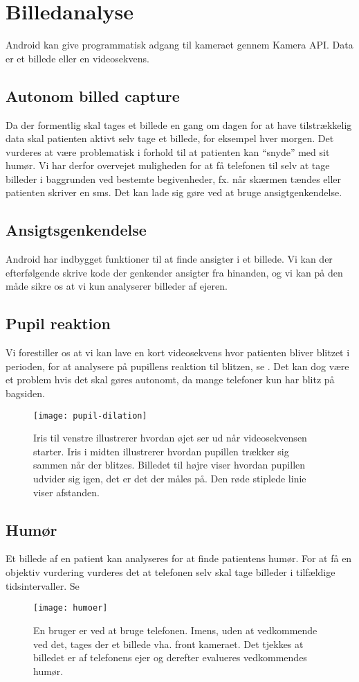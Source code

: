 \section{Billedanalyse}
Android kan give programmatisk adgang til kameraet gennem Kamera API. Data er et billede eller en videosekvens.

\subsection{Autonom billed capture}
Da der formentlig skal tages et billede en gang om dagen for at have tilstrækkelig data skal patienten aktivt selv tage et billede, for eksempel hver morgen.
Det vurderes at være problematisk i forhold til at patienten kan ``snyde'' med sit humør.
Vi har derfor overvejet muligheden for at få telefonen til selv at tage billeder i baggrunden ved bestemte begivenheder, fx. når skærmen tændes eller patienten skriver en sms.
Det kan lade sig gøre ved at bruge ansigtgenkendelse.

\subsection{Ansigtsgenkendelse}
Android har indbygget funktioner til at finde ansigter i et billede. 
Vi kan der efterfølgende skrive kode der genkender ansigter fra hinanden, og vi kan på den måde sikre os at vi kun analyserer billeder af ejeren.%

\subsection{Pupil reaktion}
Vi forestiller os at vi kan lave en kort videosekvens hvor patienten bliver blitzet i perioden, for at analysere på pupillens reaktion til blitzen, se \cite{hoeks1993pupillary}.
Det kan dog være et problem hvis det skal gøres autonomt, da mange telefoner kun har blitz på bagsiden.
\begin{figure}
	\centering
\texttt{[image: pupil-dilation]}
\caption{Iris til venstre illustrerer hvordan øjet ser ud når videosekvensen starter. Iris i midten illustrerer hvordan pupillen trækker sig sammen når der blitzes. Billedet til højre viser hvordan pupillen udvider sig igen, det er det der måles på. Den røde stiplede linie viser afstanden.}
\end{figure}

\subsection{Humør}

Et billede af en patient kan analyseres for at finde patientens humør. 
For at få en objektiv vurdering vurderes det at telefonen selv skal tage billeder i tilfældige tidsintervaller. 
Se \cite{kulkarni2009facial}
\begin{figure}
	\centering
\texttt{[image: humoer]}
\caption{En bruger er ved at bruge telefonen. Imens, uden at vedkommende ved det, tages der et billede vha. front kameraet. Det tjekkes at billedet er af telefonens ejer og derefter evalueres vedkommendes humør.}
\end{figure}